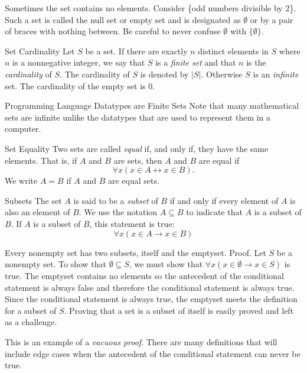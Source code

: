 \documentclass [handout]{beamer}
\begin{document}
 \begin{frame}
 Sometimes the set contains no elements. Consider \{odd numbers divisible by 2\}. Such a set is called the null set or empty set and is designated as $\emptyset$ or by a pair of braces with nothing between. Be careful to never confuse $\emptyset$ with $\{\emptyset\}$.
 \end{frame}
 
 \begin{frame}{Set Cardinality}
 Let $S$ be a set. If there are exactly $n$ distinct elements in $S$ where $n$ is a nonnegative integer, we say that $S$ is a \textit{finite set} and that $n$ is the \textit{cardinality} of $S$. The cardinality of $S$ is denoted by $|S|$. Otherwise $S$ is an \textit{infinite} set. The cardinality of the empty set is 0.
 \end{frame}
 
 \begin{frame}{Programming Language Datatypes are Finite Sets}
 Note that many mathematical sets are infinite unlike the datatypes that are used to represent them in a computer. 
 \end{frame}
 
 \begin{frame}{Set Equality}
 Two sets are called \textit{equal} if, and only if, they have the same elements. That is, if $A$ and $B$ are sets, then $A$ and $B$ are equal if 
 \begin{displaymath}
 \forall x(x\in A \leftrightarrow x\in B).
 \end{displaymath}
 We write $A=B$ if $A$ and $B$ are equal sets.
 \end{frame}
 
 \begin{frame}{Subsets}
 The set $A$ is said to be a \textit{subset} of $B$ if and only if every element of $A$ is also an element of $B$. We use the notation $A\subseteq B$ to indicate that $A$ is a subset of $B$. If $A$ is a subset of $B$, this statement is true:
\begin{displaymath}
 \forall x(x\in A \rightarrow x\in B)
 \end{displaymath}
 \end{frame}
 
 \begin{frame}
 Every nonempty set has two subsets, itself and the emptyset. 
Proof. Let $S$ be a nonempty set. To show that $\emptyset \subseteq S$, we must show that $\forall x(x\in\emptyset \rightarrow x \in S)$ is true. The emptyset contains no elements so the antecedent of the conditional statement is always false and therefore the conditional statement is always true. Since the conditional statement is always true, the emptyset meets the definition for a subset of $S$. Proving that a set is a subset of itself is easily proved and left as a challenge.
 
 This is an example of a \textit{vacuous proof}. There are many definitions that will include edge cases when the antecedent of the conditional statement can never be true.
 \end{frame}
 
\end{document}
